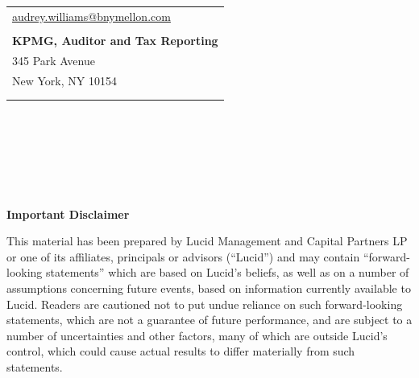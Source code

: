 \documentclass[9pt]{article}
\begin{document}
\begin{center}
\begin{tabular}{p{\textwidth}}
                     \underline{audrey.williams@bnymellon.com}                                                              \\
                     \rowcolor[HTML]{EFEFEF}
                     \\
                     \rowcolor[HTML]{EFEFEF}
                     \textbf{KPMG, Auditor and Tax Reporting}                                                           \\
                     \rowcolor[HTML]{EFEFEF}
                     345 Park Avenue                                                           \\
                     \rowcolor[HTML]{EFEFEF}
                     New York, NY 10154                                                           \\
                     \rowcolor[HTML]{EFEFEF}
                     \\
                     \rowcolor[HTML]{EFEFEF}

        \end{tabular}
    \end{center}

    \pagebreak

    \ \\
    \ \\
    \ \\
    \ \\
    \ \\
    \ \\

    \noindent\textbf{\color{lucid_blue}Important Disclaimer}

    \small

    \noindent This material has been prepared by Lucid Management and Capital Partners LP or one of its affiliates, principals or advisors (``Lucid'') and may contain ``forward-looking statements'' which are based on Lucid's beliefs, as well as on a number of assumptions concerning future events, based on information currently available to Lucid. Readers are cautioned not to put undue reliance on such forward-looking statements, which are not a guarantee of future performance, and are subject to a number of uncertainties and other factors, many of which are outside Lucid's control, which could cause actual results to differ materially from such statements.
\end{document}
